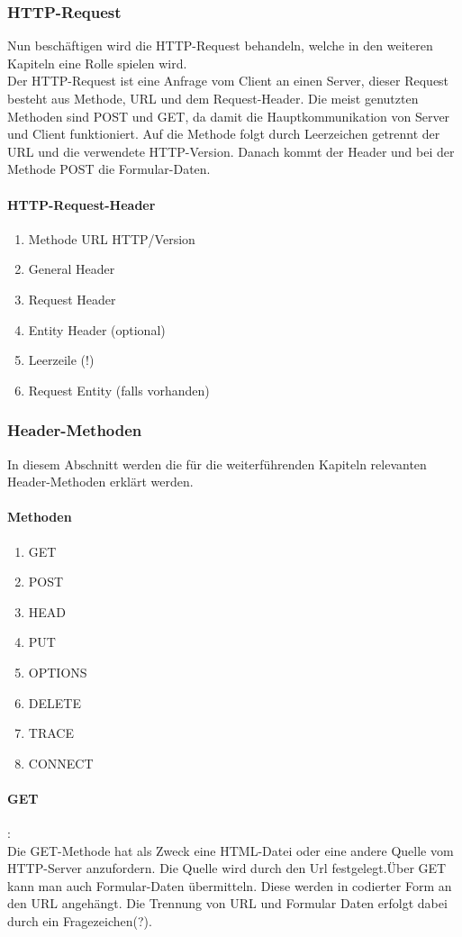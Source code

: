 {\subsubsection{HTTP-Request}
Nun beschäftigen wird die HTTP-Request behandeln, welche in den weiteren Kapiteln eine Rolle spielen wird.\\Der HTTP-Request ist eine Anfrage vom Client an einen Server, dieser Request besteht aus Methode, URL und dem Request-Header. Die meist genutzten Methoden sind POST und GET, da damit die Hauptkommunikation von Server und Client funktioniert. Auf die Methode folgt durch Leerzeichen getrennt der URL und die verwendete HTTP-Version. Danach kommt der Header und bei der Methode POST die Formular-Daten.
\paragraph{HTTP-Request-Header}
\begin{enumerate}
\item Methode URL HTTP/Version
\item General Header
\item Request Header
\item Entity Header (optional)
\item Leerzeile (!)
\item Request Entity (falls vorhanden)
\end{enumerate}
\subsubsection{Header-Methoden}
In diesem Abschnitt werden die für die weiterführenden Kapiteln relevanten Header-Methoden erklärt werden.
\paragraph{Methoden}
\begin{enumerate}
\item GET
\item POST
\item HEAD
\item PUT
\item OPTIONS
\item DELETE
\item TRACE
\item CONNECT
\end{enumerate}
\paragraph{GET}:\\Die GET-Methode hat als Zweck eine HTML-Datei oder eine andere Quelle vom HTTP-Server anzufordern. Die Quelle wird durch den Url festgelegt.Über GET kann man auch Formular-Daten übermitteln. Diese werden in codierter Form an den URL angehängt. Die Trennung von URL und Formular Daten erfolgt dabei durch ein Fragezeichen(?).
}
